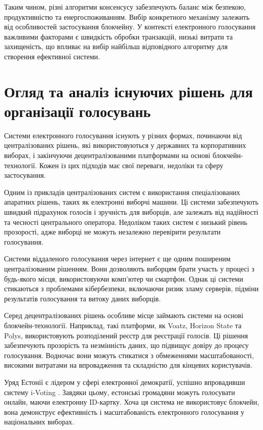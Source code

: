\documentclass[14pt]{extreport}
\begin{document}
  Таким чином, різні алгоритми консенсусу забезпечують баланс між безпекою, продуктивністю та енергоспоживанням. Вибір конкретного механізму залежить від особливостей застосування блокчейну. У контексті електронного голосування важливими факторами є швидкість обробки транзакцій, низькі витрати та захищеність, що впливає на вибір найбільш відповідного алгоритму для створення ефективної системи.
  
  \section{Огляд та аналіз існуючих рішень для організації голосувань}
  
  Системи електронного голосування існують у різних формах, починаючи від централізованих рішень, які використовуються у державних та корпоративних виборах, і закінчуючи децентралізованими платформами на основі блокчейн-технології. Кожен із цих підходів має свої переваги, недоліки та сферу застосування.

  Одним із прикладів централізованих систем є використання спеціалізованих апаратних рішень, таких як електронні виборчі машини. Ці системи забезпечують швидкий підрахунок голосів і зручність для виборців, але залежать від надійності та чесності центрального оператора. Недоліком таких систем є низький рівень прозорості, адже виборці не можуть незалежно перевірити результати голосування.

  Системи віддаленого голосування через інтернет є ще одним поширеним централізованим рішенням. Вони дозволяють виборцям брати участь у процесі з будь-якого місця, використовуючи комп’ютер чи смартфон. Однак ці системи стикаються з проблемами кібербезпеки, включаючи ризик зламу серверів, підміни результатів голосування та витоку даних виборців.

  Серед децентралізованих рішень особливе місце займають системи на основі блокчейн-технології. Наприклад, такі платформи, як Voatz, Horizon State та Polys, використовують розподілений реєстр для реєстрації голосів. Ці рішення забезпечують прозорість та незмінність даних, що підвищує довіру до процесу голосування. Водночас вони можуть стикатися з обмеженнями масштабованості, високими витратами на впровадження та складністю для кінцевих користувачів.

  Уряд Естонії є лідером у сфері електронної демократії, успішно впровадивши систему i-Voting \cite{ivoting}. Завдяки цьому, естонські громадяни можуть голосувати онлайн, маючи електронну ID-картку. Хоча ця система не використовує блокчейн, вона демонструє ефективність і масштабованість електронного голосування у національних виборах.
\end{document}
